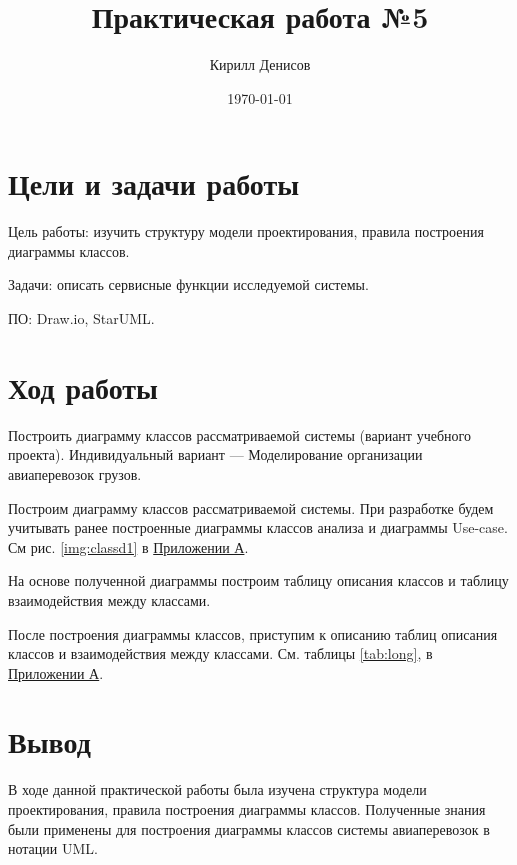 \documentclass[a4paper,14pt]{extarticle}
\author{Кирилл Денисов}
\title{Практическая работа №5}
\date{\today}
\newcommand{\pathToCommonFolder}{/home/denilai/Desktop/LaTeX/Common}
\begin{document}
\thispagestyle{empty}



\newpage
\tableofcontents
\newpage	
\section{Цели и задачи работы}
Цель работы: изучить структуру модели проектирования, правила построения диаграммы классов.

Задачи: описать сервисные функции исследуемой системы.

ПО: Draw.io, StarUML.

\section{Ход работы}
\begin{problem}
Построить диаграмму классов рассматриваемой системы (вариант учебного проекта). Индивидуальный вариант --- Моделирование организации авиаперевозок грузов.
\end{problem}
\begin{nonum}
Построим диаграмму классов рассматриваемой системы. При разработке будем учитывать ранее построенные диаграммы классов анализа и диаграммы Use-case. См  рис. \ref {img:classd1} в \hyperref[sec:pril]{Приложении А}.

\normalsize
\end{nonum}

\begin{problem}
	На основе полученной диаграммы построим таблицу описания классов и таблицу взаимодействия между классами. 
\end{problem}

\begin{nonum}
	После построения диаграммы классов, приступим к описанию таблиц описания классов и взаимодействия между классами. См. таблицы \ref{tab:long},  в \hyperref[sec:pril]{Приложении А}.
\end{nonum}


\section{Вывод}
В ходе данной практической работы была изучена структура модели проектирования, правила построения диаграммы классов. Полученные знания были применены для построения диаграммы классов системы авиаперевозок в нотации UML. 


\newpage
{\centering
}
\end{document}
